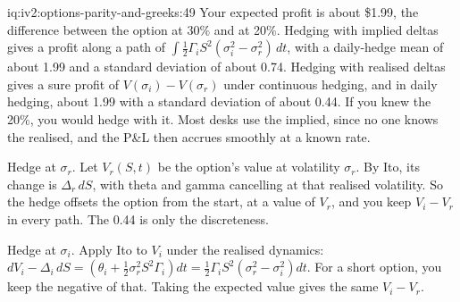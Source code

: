 \begin{solution}{iq:iv2:options-parity-and-greeks:49}
Your expected profit is about \$1.99, the difference between the option at 30\% and at 20\%. Hedging with implied deltas gives a profit along a path of $\int\tfrac12\Gamma_iS^2(\sigma_i^2 - \sigma_r^2)\,dt$, with a daily-hedge mean of about 1.99 and a standard deviation of about 0.74. Hedging with realised deltas gives a sure profit of $V(\sigma_i) - V(\sigma_r)$ under continuous hedging, and in daily hedging, about 1.99 with a standard deviation of about 0.44. If you knew the 20\%, you would hedge with it. Most desks use the implied, since no one knows the realised, and the P\&L then accrues smoothly at a known rate.

Hedge at $\sigma_r$. Let $V_r(S, t)$ be the option's value at volatility $\sigma_r$. By Ito, its change is $\Delta_r\,dS$, with theta and gamma cancelling at that realised volatility. So the hedge offsets the option from the start, at a value of $V_r$, and you keep $V_i - V_r$ in every path. The 0.44 is only the discreteness.

Hedge at $\sigma_i$. Apply Ito to $V_i$ under the realised dynamics: $dV_i - \Delta_i\,dS = (\theta_i + \tfrac12\sigma_r^2S^2\Gamma_i)dt = \tfrac12\Gamma_iS^2(\sigma_r^2 - \sigma_i^2)dt$. For a short option, you keep the negative of that. Taking the expected value gives the same $V_i - V_r$.

\end{solution}

